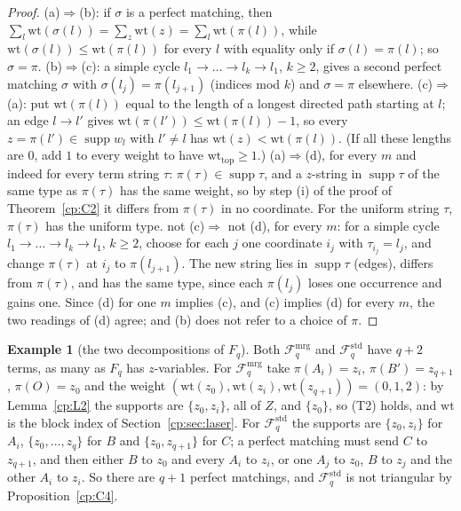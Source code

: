 \documentclass[11pt]{article}
\theoremstyle{definition}
\newtheorem{example}[theorem]{Example}  %
\theoremstyle{remark}
\DeclareMathOperator{\supp}{supp}
\newcommand{\Tcond}[1]{\textup{(T#1)}}        %
\newcommand{\Fstd}{\mathcal{F}^{\mathrm{std}}_q} %
\newcommand{\Fmrg}{\mathcal{F}^{\mathrm{mrg}}_q} %
\newcommand{\Bp}{B'}                          %
\newcommand{\Oterm}{O}                        %
\newcommand{\wt}{\mathrm{wt}}                %
\newcommand{\wtop}{\mathrm{wt}_{\mathrm{top}}}
\begin{document}
\begin{proof}
(a)$\Rightarrow$(b): if $\sigma$ is a perfect matching, then $\sum_l\wt(\sigma(l))=\sum_z\wt(z)=\sum_l\wt(\pi(l))$, while $\wt(\sigma(l))\le\wt(\pi(l))$ for every $l$ with equality only if $\sigma(l)=\pi(l)$; so $\sigma=\pi$.
(b)$\Rightarrow$(c): a simple cycle $l_1\to\dots\to l_k\to l_1$, $k\ge2$, gives a second perfect matching $\sigma$ with $\sigma(l_j)=\pi(l_{j+1})$ (indices mod $k$) and $\sigma=\pi$ elsewhere.
(c)$\Rightarrow$(a): put $\wt(\pi(l))$ equal to the length of a longest directed path starting at $l$; an edge $l\to l'$ gives $\wt(\pi(l'))\le\wt(\pi(l))-1$, so every $z=\pi(l')\in\supp w_l$ with $l'\ne l$ has $\wt(z)<\wt(\pi(l))$. (If all these lengths are $0$, add $1$ to every weight to have $\wtop\ge1$.)
(a)$\Rightarrow$(d), for every $m$ and indeed for every term string $\tau$: $\pi(\tau)\in\supp\tau$, and a $z$-string in $\supp\tau$ of the same type as $\pi(\tau)$ has the same weight, so by step (i) of the proof of Theorem~\ref{cp:C2} it differs from $\pi(\tau)$ in no coordinate. For the uniform string $\tau$, $\pi(\tau)$ has the uniform type.
not (c)$\Rightarrow$ not (d), for every $m$: for a simple cycle $l_1\to\dots\to l_k\to l_1$, $k\ge2$, choose for each $j$ one coordinate $i_j$ with $\tau_{i_j}=l_j$, and change $\pi(\tau)$ at $i_j$ to $\pi(l_{j+1})$. The new string lies in $\supp\tau$ (edges), differs from $\pi(\tau)$, and has the same type, since each $\pi(l_j)$ loses one occurrence and gains one.
Since (d) for one $m$ implies (c), and (c) implies (d) for every $m$, the two readings of (d) agree; and (b) does not refer to a choice of $\pi$.
\end{proof}

\begin{example}[the two decompositions of $F_q$]\label{cp:C4:ex}
Both $\Fmrg$ and $\Fstd$ have $q+2$ terms, as many as $F_q$ has $z$-variables. For $\Fmrg$ take $\pi(A_i)=z_i$, $\pi(\Bp)=z_{q+1}$, $\pi(\Oterm)=z_0$ and the weight $(\wt(z_0),\wt(z_i),\wt(z_{q+1}))=(0,1,2)$: by Lemma~\ref{cp:L2} the supports are $\{z_0,z_i\}$, all of $Z$, and $\{z_0\}$, so \Tcond2{} holds, and $\wt$ is the block index of Section~\ref{cp:sec:laser}. For $\Fstd$ the supports are $\{z_0,z_i\}$ for $A_i$, $\{z_0,\dots,z_q\}$ for $B$ and $\{z_0,z_{q+1}\}$ for $C$; a perfect matching must send $C$ to $z_{q+1}$, and then either $B$ to $z_0$ and every $A_i$ to $z_i$, or one $A_j$ to $z_0$, $B$ to $z_j$ and the other $A_i$ to $z_i$. So there are $q+1$ perfect matchings, and $\Fstd$ is not triangular by Proposition~\ref{cp:C4}.
\end{example}
\end{document}
